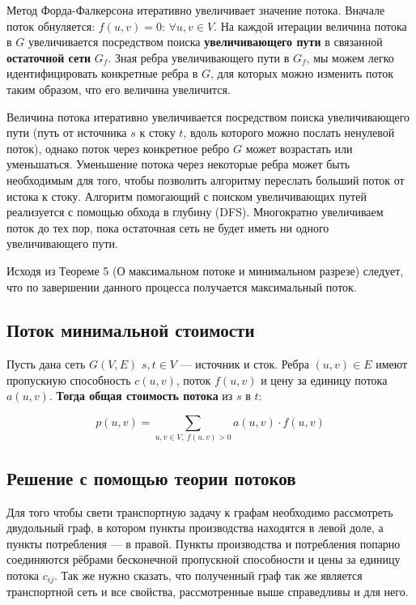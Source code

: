 \documentclass[a4paper,12pt]{article}
\begin{document}
Метод Форда-Фалкерсона итеративно увеличивает значение потока. Вначале поток обнуляется: $f(u,v) = 0$: $\forall u, v \in V$. На каждой итерации величина потока в $G$ увеличивается посредством поиска \textbf{увеличивающего пути} в связанной \textbf{остаточной сети} $G_f$. Зная ребра увеличивающего пути в $G_f$, мы можем легко идентифицировать конкретные ребра в $G$, для которых можно изменить поток таким образом, что его величина увеличится. 

Величина потока итеративно увеличивается посредством поиска увеличивающего пути (путь от источника $s$ к стоку $t$, вдоль которого можно послать ненулевой поток), однако поток через конкретное ребро $G$ может возрастать или уменьшаться. Уменьшение потока через некоторые ребра может быть необходимым для того, чтобы позволить алгоритму переслать больший поток от истока к стоку. Алгоритм помогающий с поиском увеличивающих путей реализуется с помощью обхода в глубину (DFS). Многократно увеличиваем поток до тех пор, пока остаточная сеть не будет иметь ни одного увеличивающего пути. 

Исходя из Теореме 5 (О максимальном потоке и минимальном разрезе) следует, что по завершении данного процесса получается максимальный поток.

\subsection{Поток минимальной стоимости}

Пусть дана сеть $G(V,E)$ $s,t \in V$ — источник и сток. Ребра $(u,v) \in E$ имеют пропускную способность $c(u,v)$, поток $f(u,v)$ и цену за единицу потока $a(u,v)$. \textbf{Тогда общая стоимость потока} из $s$ в $t$:

\[
	p(u,v) = \sum\limits_{u,v \in V, \ f(u,v) > 0} a(u,v) \cdot f(u,v)
\]

\clearpage

\subsection{Решение с помощью теории потоков}

Для того чтобы свети транспортную задачу к графам необходимо рассмотреть двудольный граф, в котором пункты производства находятся в левой доле, а пункты потребления — в правой. Пункты производства и потребления попарно соединяются рёбрами бесконечной пропускной способности и цены за единицу потока $c_{ij}$. Так же нужно сказать, что полученный граф так же является транспортной сеть и все свойства, рассмотренные выше справедливы и для него.
\end{document}
